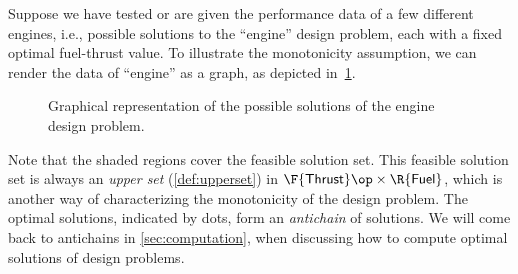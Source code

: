 \begin{example}
Suppose we have tested or are given the performance data of a few different engines, i.e., possible solutions to the ``engine'' design problem, each with a fixed optimal fuel-thrust value. To illustrate the monotonicity assumption, we can render the data of ``engine'' as a graph, as depicted in~\cref{fig:solenginedp}.
\begin{figure}[h!]
\begin{center}
\end{center}
\caption{Graphical representation of the possible solutions of the engine design problem. \label{fig:solenginedp}}
\end{figure}

Note that the shaded regions cover the feasible solution set. This feasible solution set is always an \emph{upper set} (\cref{def:upperset}) in $\F{\mathsf{Thrust}}\op \times \R{\mathsf{Fuel}}$, which is another way of characterizing the monotonicity of the design problem. The optimal solutions, indicated by dots, form an \emph{antichain} of solutions. We will come back to antichains in \cref{sec:computation}, when discussing how to compute optimal solutions of design problems.
\end{example}



